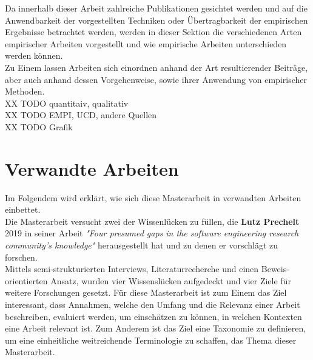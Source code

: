 Da innerhalb dieser Arbeit zahlreiche Publikationen gesichtet werden und auf die Anwendbarkeit der vorgestellten Techniken oder Übertragbarkeit der empirischen Ergebnisse betrachtet werden, werden in dieser Sektion die verschiedenen Arten empirischer Arbeiten vorgestellt und wie empirische Arbeiten unterschieden werden können. \\

Zu Einem lassen Arbeiten sich einordnen anhand der Art resultierender Beiträge, aber auch anhand dessen Vorgehenweise, sowie ihrer Anwendung von empirischer Methoden. \\

XX TODO quantitaiv, qualitativ  \\

XX TODO EMPI, UCD, andere Quellen  \\
XX TODO Grafik \\


\section{Verwandte Arbeiten}
\label{sec:verwandt}

Im Folgendem wird erklärt, wie sich diese Masterarbeit in verwandten Arbeiten einbettet. \\

Die Masterarbeit versucht zwei der Wissenlücken zu füllen, die \textbf{Lutz Prechelt} 2019 in seiner Arbeit \textit{"Four presumed gaps in the software engineering research community's knowledge"} herausgestellt hat und zu denen er vorschlägt zu forschen. \cite{prechelt2019}\\
Mittels semi-strukturierten Interviews, Literaturrecherche und einen Beweis-orientierten Ansatz, wurden vier Wissenslücken aufgedeckt und vier Ziele für weitere Forschungen gesetzt. Für diese Masterarbeit ist zum Einem das Ziel interessant, dass Annahmen, welche den Umfang und die Relevanz einer Arbeit beschreiben, evaluiert werden, um einschätzen zu können, in welchen Kontexten eine Arbeit relevant ist. Zum Anderem ist das Ziel eine Taxonomie zu definieren, um eine einheitliche weitreichende Terminologie zu schaffen, das Thema dieser Masterarbeit. \\

